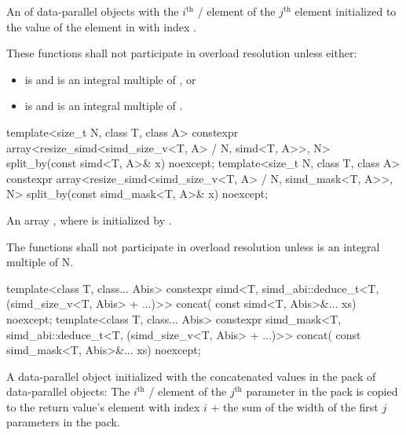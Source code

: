 \begin{itemdescr}
  \pnum\returns
  An  of data-parallel objects with the $i^\text{th}$ / element of the $j^\text{th}$  element initialized to the value of the element in  with index .

  \pnum\remarks
  These functions shall not participate in overload resolution unless either:
  \begin{itemize}
    \item {} is  and  is an integral multiple of , or
    \item {} is  and  is an integral multiple of .
  \end{itemize}
\end{itemdescr}

\begin{itemdecl}
template<size_t N, class T, class A>
  constexpr array<resize_simd<simd_size_v<T, A> / N, simd<T, A>>, N>
    split_by(const simd<T, A>& x) noexcept;
template<size_t N, class T, class A>
  constexpr array<resize_simd<simd_size_v<T, A> / N, simd_mask<T, A>>, N>
    split_by(const simd_mask<T, A>& x) noexcept;
\end{itemdecl}

\begin{itemdescr}
  \pnum\returns
  An array , where  is initialized by .

  \pnum\remarks
  The functions shall not participate in overload resolution unless  is an integral multiple of \tcode N.
\end{itemdescr}

\begin{itemdecl}
template<class T, class... Abis>
  constexpr simd<T, simd_abi::deduce_t<T, (simd_size_v<T, Abis> + ...)>> concat(
    const simd<T, Abis>&... xs) noexcept;
template<class T, class... Abis>
  constexpr simd_mask<T, simd_abi::deduce_t<T, (simd_size_v<T, Abis> + ...)>> concat(
    const simd_mask<T, Abis>&... xs) noexcept;
\end{itemdecl}

\begin{itemdescr}
  \pnum\returns
  A data-parallel object initialized with the concatenated values in the  pack of data-parallel objects: The $i^\text{th}$ / element of the $j^\text{th}$ parameter in the  pack is copied to the return value's element with index $i$ + the sum of the width of the first $j$ parameters in the  pack.
\end{itemdescr}

